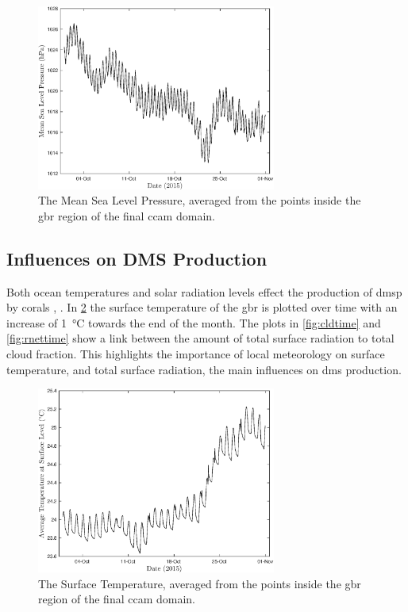 	\begin{figure}[!htb]
	    \centering
	    \includegraphics[width=0.7\textwidth]{Fig/Research/CCAM/GBRAveragedPlot_psl.eps}
	    \caption{ The Mean Sea Level Pressure, averaged from the points inside the \gls{gbr} region of the final \gls{ccam} domain. }
	    \label{fig:psltime}
	\end{figure}

	\clearpage

	\subsection{Influences on DMS Production}
	\label{subsec:dmsinfl}

	Both ocean temperatures and solar radiation levels effect the production of \gls{dmsp} by corals \citep{raina:2013fj}, \citep{fischer2012atmospheric}. In \cref{fig:tsutime} the surface temperature of the \gls{gbr} is plotted over time with an increase of \SI{1}{\celsius} towards the end of the month. The plots in \cref{fig:cldtime} and \cref{fig:rnettime} show a link between the amount of total surface radiation to total cloud fraction. This highlights the importance of local meteorology on surface temperature, and total surface radiation, the main influences on \gls{dms} production. 

	\begin{figure}[!htb]
	    \centering
	    \includegraphics[width=0.7\textwidth]{Fig/Research/CCAM/GBRAveragedPlot_tsu_ave.eps}
	    \caption{ The Surface Temperature, averaged from the points inside the \gls{gbr} region of the final \gls{ccam} domain. }
	    \label{fig:tsutime}
	\end{figure}

